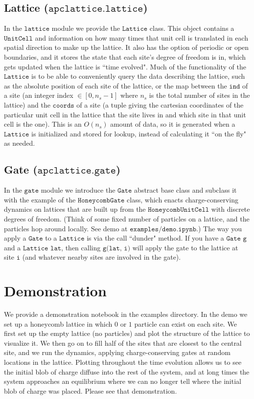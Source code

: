 \documentclass{article}
\begin{document}
\subsection{Lattice ($\texttt{apclattice.lattice}$)}
In the $\texttt{lattice}$ module we provide the $\texttt{Lattice}$ class. This object contains a $\texttt{UnitCell}$ and information on how many times that unit cell is translated in each spatial direction to make up the lattice. It also has the option of periodic or open boundaries, and it stores the state that each site's degree of freedom is in, which gets updated when the lattice is ``time evolved". Much of the functionality of the $\texttt{Lattice}$ is to be able to conveniently query the data describing the lattice, such as the absolute position of each site of the lattice, or the map between the $\texttt{ind}$ of a site (an integer index $\in [0, n_s-1]$ where $n_s$ is the total number of sites in the lattice) and the $\texttt{coords}$ of a site (a tuple giving the cartesian coordinates of the particular unit cell in the lattice that the site lives in and which site in that unit cell is the one). This is an $O(n_s)$ amount of data, so it is generated when a $\texttt{Lattice}$ is initialized and stored for lookup, instead of calculating it ``on the fly" as needed.

\subsection{Gate ($\texttt{apclattice.gate}$)}
In the $\texttt{gate}$ module we introduce the $\texttt{Gate}$ abstract base class and subclass it with the example of the $\texttt{HoneycombGate}$ class, which enacts charge-conserving dynamics on lattices that are built up from the $\texttt{HoneycombUnitCell}$ with discrete degrees of freedom. (Think of some fixed number of particles on a lattice, and the particles hop around locally. See demo at $\texttt{examples/demo.ipynb}$.) The way you apply a $\texttt{Gate}$ to a $\texttt{Lattice}$ is via the call ``dunder" method. If you have a $\texttt{Gate}$ $\texttt{g}$ and a $\texttt{Lattice}$ $\texttt{lat}$, then calling $\texttt{g(lat, i)}$ will apply the gate to the lattice at site $\texttt{i}$ (and whatever nearby sites are involved in the gate).

\section{Demonstration}
We provide a demonstration notebook in the examples directory. In the demo we set up a honeycomb lattice in which $0$ or $1$ particle can exist on each site. We first set up the empty lattice (no particles) and plot the structure of the lattice to visualize it. We then go on to fill half of the sites that are closest to the central site, and we run the dynamics, applying charge-conserving gates at random locations in the lattice. Plotting throughout the time evolution allows us to see the initial blob of charge diffuse into the rest of the system, and at long times the system approaches an equilibrium where we can no longer tell where the initial blob of charge was placed. Please see that demonstration.
\end{document}
